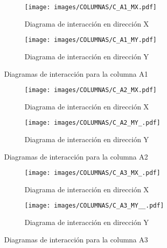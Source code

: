 \begin{figure}[H]
     \centering
     \begin{subfigure}[b]{0.45\textwidth}
         \centering
         \texttt{[image: images/COLUMNAS/C\_A1\_MX.pdf]}
         \caption{Diagrama de interacción en dirección X}
         \label{fig:CA1 X}
     \end{subfigure}
     \hfill
     \begin{subfigure}[b]{0.45\textwidth}
         \centering
         \texttt{[image: images/COLUMNAS/C\_A1\_MY.pdf]}
         \caption{Diagrama de interacción en dirección Y}
         \label{fig:CA1 Y}
     \end{subfigure}
    
        \caption{Diagramas de interacción para la columna A1}
        \label{fig:A1}
\end{figure}


\begin{figure}[H]
     \centering
     \begin{subfigure}[b]{0.45\textwidth}
         \centering
         \texttt{[image: images/COLUMNAS/C\_A2\_MX.pdf]}
         \caption{Diagrama de interacción en dirección X}
         \label{fig:CA2 X}
     \end{subfigure}
     \hfill
     \begin{subfigure}[b]{0.45\textwidth}
         \centering
         \texttt{[image: images/COLUMNAS/C\_A2\_MY\_.pdf]}
         \caption{Diagrama de interacción en dirección Y}
         \label{fig:CA2 Y}
     \end{subfigure}
    
        \caption{Diagramas de interacción para la columna A2}
        \label{fig:A2}
\end{figure}


\begin{figure}[H]
     \centering
     \begin{subfigure}[b]{0.45\textwidth}
         \centering
         \texttt{[image: images/COLUMNAS/C\_A3\_MX\_.pdf]}
         \caption{Diagrama de interacción en dirección X}
         \label{fig:CA3 X}
     \end{subfigure}
     \hfill
     \begin{subfigure}[b]{0.45\textwidth}
         \centering
         \texttt{[image: images/COLUMNAS/C\_A3\_MY\_\_.pdf]}
         \caption{Diagrama de interacción en dirección Y}
         \label{fig:CA3 Y}
     \end{subfigure}
    
        \caption{Diagramas de interacción para la columna A3}
        \label{fig:A3}
\end{figure}

